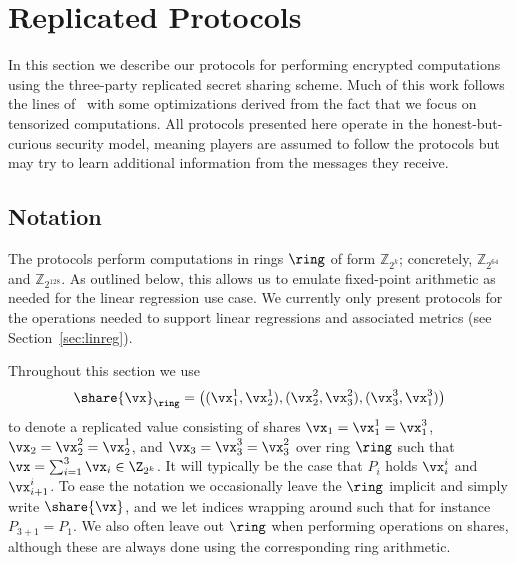 \section{Replicated Protocols}

In this section we describe our protocols for performing encrypted computations using the three-party replicated secret sharing scheme. Much of this work follows the lines of~\cite{CCS:AFLNO16} with some optimizations derived from the fact that we focus on tensorized computations. All protocols presented here operate in the honest-but-curious security model, meaning players are assumed to follow the protocols but may try to learn additional information from the messages they receive.



\subsection{Notation}
The protocols perform computations in rings $\ring$ of form $\mathbb{Z}_{2^{k}}$; concretely, $\mathbb{Z}_{2^{64}}$ and $\mathbb{Z}_{2^{128}}$. As outlined below, this allows us to emulate fixed-point arithmetic as needed for the linear regression use case. We currently only present protocols for the operations needed to support linear regressions and associated metrics (see Section~\ref{sec:linreg}).

Throughout this section we use 
$$
\share{\vx}_\ring = \left( (\vx_1^1, \vx_2^1), (\vx_2^2, \vx_3^2), (\vx_3^3, \vx_1^3) \right)
$$
to denote a replicated value consisting of shares $\vx_1 = \vx_1^1 = \vx_1^3$, $\vx_2 = \vx_2^2 = \vx_2^1$, and $\vx_3 = \vx_3^3 = \vx_3^2$ over ring $\ring$ such that $\vx = \sum_{i=1}^3 \vx_i \in \Z_{2^k}$. It will typically be the case that $P_i$ holds $\vx_i^i$ and $\vx_{i+1}^i$. To ease the notation we occasionally leave the $\ring$ implicit and simply write $\share{\vx}$, and we let indices wrapping around such that for instance $P_{3+1} = P_1$. We also often leave out $\ring$ when performing operations on shares, although these are always done using the corresponding ring arithmetic.








%
